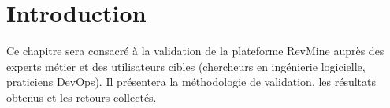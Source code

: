 
\section{Introduction}

Ce chapitre sera consacré à la validation de la plateforme RevMine auprès des experts métier et des utilisateurs cibles (chercheurs en ingénierie logicielle, praticiens DevOps). Il présentera la méthodologie de validation, les résultats obtenus et les retours collectés.
